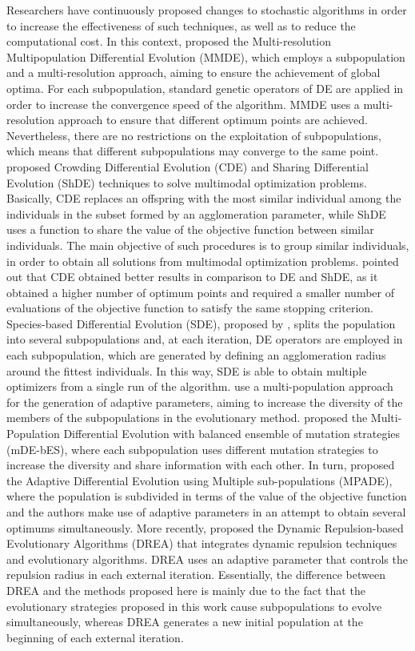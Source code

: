 \documentclass[smallextended]{svjour3}       %
\begin{document}
Researchers have continuously proposed changes to stochastic algorithms in order to increase the effectiveness of such techniques, as well as to reduce the computational cost. In this context, \cite{bib:zaharie2004multipopulation} proposed the Multi-resolution Multipopulation Differential Evolution (MMDE), which employs a subpopulation and a multi-resolution approach, aiming to ensure the achievement of global optima. For each subpopulation, standard genetic operators of DE are applied in order to increase the convergence speed of the algorithm. MMDE uses a multi-resolution approach to ensure that different optimum points are achieved. Nevertheless, there are no restrictions on the exploitation of subpopulations, which means that different subpopulations may converge to the same point. \cite{bib:thomsen2004multimodal} proposed Crowding Differential Evolution (CDE) and Sharing Differential Evolution (ShDE) techniques to solve multimodal optimization problems. Basically, CDE replaces an offspring with the most similar individual among the individuals in the subset formed by an agglomeration parameter, while ShDE uses a function to share the value of the objective function between similar individuals. The main objective of such procedures is to group similar individuals, in order to obtain all solutions from multimodal optimization problems. \cite{bib:thomsen2004multimodal} pointed out that CDE obtained better results in comparison to DE and ShDE, as it obtained a higher number of optimum points and required a smaller number of evaluations of the objective function to satisfy the same stopping criterion. Species-based Differential Evolution (SDE), proposed by  \cite{bib:li2005efficient}, splits the population into several subpopulations and, at each iteration, DE operators are employed in each subpopulation, which are generated by defining an agglomeration radius around the fittest individuals. In this way, SDE is able to obtain multiple optimizers from a single run of the algorithm. \cite{bib:yu2011multi} use a multi-population approach for the generation of adaptive parameters, aiming to increase the diversity of the members of the subpopulations in the evolutionary method. \cite{bib:ali2015multi} proposed the Multi-Population Differential Evolution with balanced ensemble of mutation strategies (mDE-bES), where each subpopulation uses different mutation strategies to increase the diversity and share information with each other. In turn, \cite{bib:cui2016adaptive} proposed the Adaptive Differential Evolution using Multiple sub-populations (MPADE), where the population is subdivided in terms of the value of the objective function and the authors make use of adaptive parameters in an attempt to obtain several optimums simultaneously. More recently, \cite{bib:Liao2018} proposed the Dynamic Repulsion-based Evolutionary Algorithms (DREA) that integrates dynamic repulsion techniques and evolutionary algorithms. DREA uses an adaptive parameter that controls the repulsion radius in each external iteration. Essentially, the difference between DREA and the methods proposed here is mainly due to the fact that the evolutionary strategies proposed in this work cause subpopulations to evolve simultaneously, whereas DREA generates a new initial population at the beginning of each external iteration.
\end{document}
